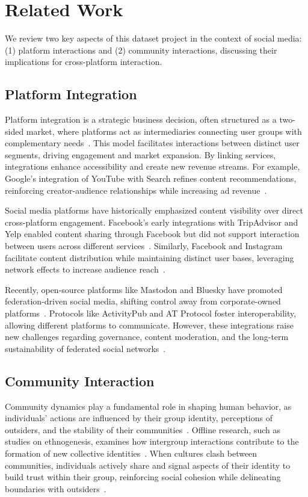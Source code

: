 \section{Related Work}
We review two key aspects of this dataset project in the context of social media: (1) platform interactions and (2) community interactions, discussing their implications for cross-platform interaction.

\subsection{Platform Integration}
Platform integration is a strategic business decision, often structured as a two-sided market, where platforms act as intermediaries connecting user groups with complementary needs~\cite{schreieck2024typology, evans2016matchmakers, rochet2003platform}. This model facilitates interactions between distinct user segments, driving engagement and market expansion. By linking services, integrations enhance accessibility and create new revenue streams. For example, Google’s integration of YouTube with Search refines content recommendations, reinforcing creator-audience relationships while increasing ad revenue~\cite{parker2017platform, huang2017social}.


Social media platforms have historically emphasized content visibility over direct cross-platform engagement. Facebook’s early integrations with TripAdvisor and Yelp enabled content sharing through Facebook but did not support interaction between users across different services~\cite{cao2024consequences, huang2017social}. Similarly, Facebook and Instagram facilitate content distribution while maintaining distinct user bases, leveraging network effects to increase audience reach~\cite{abdelkafi2019multi}.

Recently, open-source platforms like Mastodon and Bluesky have promoted federation-driven social media, shifting control away from corporate-owned platforms~\cite{la2021understanding, jeong2024bluetempnet}. Protocols like ActivityPub and AT Protocol foster interoperability, allowing different platforms to communicate. However, these integrations raise new challenges regarding governance, content moderation, and the long-term sustainability of federated social networks~\cite{zhang2024emergence}.


\subsection{Community Interaction}
Community dynamics play a fundamental role in shaping human behavior, as individuals' actions are influenced by their group identity, perceptions of outsiders, and the stability of their communities~\cite{schmidt2025concept}. Offline research, such as studies on ethnogenesis, examines how intergroup interactions contribute to the formation of new collective identities~\cite{okamura1981situational}. When cultures clash between communities, individuals actively share and signal aspects of their identity to build trust within their group, reinforcing social cohesion while delineating boundaries with outsiders~\cite{banerjee2022situational}.


